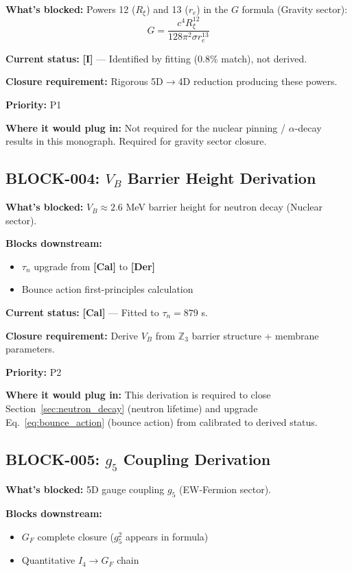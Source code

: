 \documentclass[11pt,a4paper]{article}
\newcommand{\tagI}{\textcolor{orange!80!black}{\textbf{[I]}}}
\newcommand{\tagDer}{\textcolor{green!50!black}{\textbf{[Der]}}}
\newcommand{\tagCal}{\textcolor{purple!70!black}{\textbf{[Cal]}}}
\begin{document}
\textbf{What's blocked:} Powers 12 ($R_\xi$) and 13 ($r_e$) in the $G$ formula (Gravity sector):
\begin{equation}
    G = \frac{c^4 R_\xi^{12}}{128\pi^2 \sigma r_e^{13}}
\end{equation}

\textbf{Current status:} \tagI{} --- Identified by fitting (0.8\% match), not derived.

\textbf{Closure requirement:} Rigorous 5D$\to$4D reduction producing these powers.

\textbf{Priority:} P1

\textbf{Where it would plug in:} Not required for the nuclear pinning / $\alpha$-decay results in this monograph. Required for gravity sector closure.

\subsection{BLOCK-004: $V_B$ Barrier Height Derivation}
\label{sec:L4}

\textbf{What's blocked:} $V_B \approx 2.6$ MeV barrier height for neutron decay (Nuclear sector).

\textbf{Blocks downstream:}
\begin{itemize}[nosep]
    \item $\tau_n$ upgrade from \tagCal{} to \tagDer{}
    \item Bounce action first-principles calculation
\end{itemize}

\textbf{Current status:} \tagCal{} --- Fitted to $\tau_n = 879$ s.

\textbf{Closure requirement:} Derive $V_B$ from $\mathbb{Z}_3$ barrier structure + membrane parameters.

\textbf{Priority:} P2

\textbf{Where it would plug in:} This derivation is required to close Section~\ref{sec:neutron_decay} (neutron lifetime) and upgrade Eq.~\ref{eq:bounce_action} (bounce action) from calibrated to derived status.

\subsection{BLOCK-005: $g_5$ Coupling Derivation}
\label{sec:L5}

\textbf{What's blocked:} 5D gauge coupling $g_5$ (EW-Fermion sector).

\textbf{Blocks downstream:}
\begin{itemize}[nosep]
    \item $G_F$ complete closure ($g_5^2$ appears in formula)
    \item Quantitative $I_4 \to G_F$ chain
\end{itemize}
\end{document}
